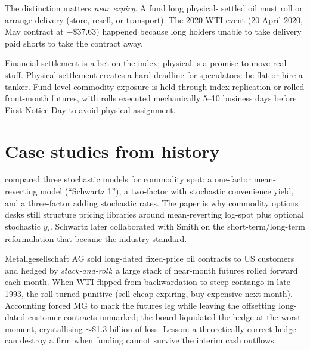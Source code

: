 The distinction matters \emph{near expiry}.  A fund long physical-
settled oil must roll or arrange delivery (store, resell, or
transport).  The 2020 WTI event (20 April 2020, May contract at
$-\$37.63$) happened because long holders unable to take delivery
paid shorts to take the contract away.

\begin{intuitionbox}
Financial settlement is a bet on the index; physical is a promise
to move real stuff.  Physical settlement creates a hard deadline
for speculators: be flat or hire a tanker.  Fund-level commodity
exposure is held through index replication or rolled front-month
futures, with rolls executed mechanically 5--10 business days
before First Notice Day to avoid physical assignment.
\end{intuitionbox}


\section{Case studies from history}
\label{sec:commodity_history}

\begin{historybox}[title={Schwartz 1997: the canonical reference}]
\citet{schwartz1997stochastic} compared three stochastic models for
commodity spot: a one-factor mean-reverting model (``Schwartz 1''),
a two-factor with stochastic convenience yield, and a three-factor
adding stochastic rates.  The paper is why commodity options desks
still structure pricing libraries around mean-reverting log-spot
plus optional stochastic $y_t$.  Schwartz later collaborated with
Smith on the short-term/long-term reformulation that became the
industry standard.
\end{historybox}

\begin{historybox}[title={Metallgesellschaft 1993: stack-and-roll blowup}]
Metallgesellschaft AG sold long-dated fixed-price oil contracts to
US customers and hedged by \emph{stack-and-roll}: a large stack of
near-month futures rolled forward each month.  When WTI flipped
from backwardation to steep contango in late 1993, the roll turned
punitive (sell cheap expiring, buy expensive next month).
Accounting forced MG to mark the futures leg while leaving the
offsetting long-dated customer contracts unmarked; the board
liquidated the hedge at the worst moment, crystallising $\sim$\$1.3
billion of loss.  Lesson: a theoretically correct hedge can destroy
a firm when funding cannot survive the interim cash outflows.
\end{historybox}

